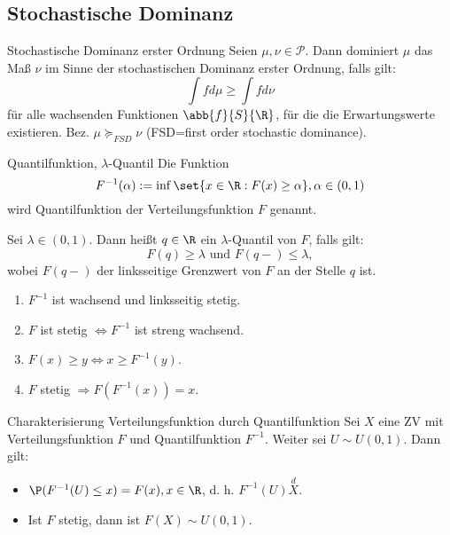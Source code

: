 \subsection{Stochastische Dominanz}

\begin{karte}{Stochastische Dominanz erster Ordnung}
Seien \(\mu, \nu \in \mathcal{P}\). Dann dominiert \(\mu\) das Maß \(\nu\) im Sinne der 
stochastischen Dominanz erster Ordnung, falls gilt: 
\[ \int f d\mu \geq \int f d \nu \]
für alle wachsenden Funktionen \(\abb{f}{S}{\R}\), für die die Erwartungswerte 
existieren. Bez. \(\mu \succeq_{FSD} \nu\) (FSD=first order stochastic dominance).
\end{karte}

\begin{karte}{Quantilfunktion, \(\lambda\)-Quantil}
Die Funktion 
\[ F^{-1}(\alpha) := \inf \set{ x\in \R: F(x) \geq \alpha }, \alpha \in (0,1) \]
wird Quantilfunktion der Verteilungsfunktion \(F\) genannt. 

Sei \(\lambda \in (0,1)\). Dann heißt \(q\in \R\) ein \(\lambda\)-Quantil von \(F\), falls gilt: 
\[ F(q) \geq \lambda \text{ und } F(q-) \leq \lambda, \]
wobei \(F(q-)\) der linksseitige Grenzwert von \(F\) an der Stelle \(q\) ist.

\begin{enumerate}
    \item \(F^{-1}\) ist wachsend und linksseitig stetig.
    \item \(F\) ist stetig \(\Leftrightarrow F^{-1}\) ist streng wachsend. 
    \item \(F(x) \geq y \Leftrightarrow x \geq F^{-1}(y)\).
    \item \(F\) stetig \(\Rightarrow F(F^{-1}(x)) = x\).
\end{enumerate}
\end{karte}

\begin{karte}{Charakterisierung Verteilungsfunktion durch Quantilfunktion}
Sei \(X\) eine ZV mit Verteilungsfunktion \(F\) und Quantilfunktion \(F^{-1}\). Weiter 
sei \(U\sim U(0,1)\). Dann gilt: 
\begin{itemize}
    \item \(\P(F^{-1}(U) \leq x) = F(x), x\in \R\), d. h. \(F^{-1}(U) \overset{d}{X}\).
    \item Ist \(F\) stetig, dann ist \(F(X) \sim U(0,1)\).
\end{itemize}
\end{karte}

